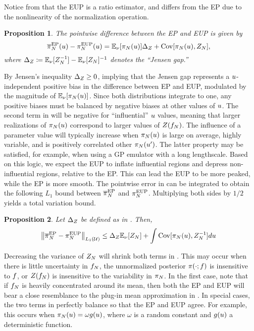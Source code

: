 \documentclass[12pt]{article}
\newtheorem{prop}{Proposition}
\begin{document}
Notice from  that the EUP is a ratio estimator, and differs from 
the EP due to the nonlinearity of the normalization operation.

\begin{prop} \label{prop:ep-eup-pw-err}
The pointwise difference between the EP and EUP is given by
\begin{equation}
\overline{\pi}_{N}^{\mathrm{EP}}(u) - \pi_{N}^{\mathrm{EUP}}(u)
= \mathbb{E}_{\nu_{}}[\pi_{N}(u)] \Delta_Z + \mathrm{Cov}[\pi_{N}(u), Z_{N}],
\label{eq:ep-eup-pw-err}
\end{equation}
where $\Delta_Z \coloneqq \mathbb{E}_{\nu_{}}[Z_{N}^{-1}] - \mathbb{E}_{\nu_{}}[Z_{N}]^{-1}$
denotes the ``Jensen gap.''
\end{prop}

By Jensen's inequality $\Delta_Z \geq 0$, implying that the Jensen gap represents a 
$u$-independent positive bias in the difference between EP and EUP, modulated by the magnitude of 
$\mathbb{E}_{\nu_{}}[\pi_{N}(u)]$. Since both distributions integrate to one, any positive 
biases must be balanced by negative biases at other values of $u$.
The second term in  will be negative for ``influential'' $u$ values, 
meaning that larger realizations of $\pi_{N}(u)$ correspond to larger values of 
$Z(f_{N})$. The influence of a parameter value will typically increase when 
$\pi_{N}(u)$ is large on average, highly variable, and is positively correlated other 
$\pi_{N}(u^\prime)$. The latter property may be satisfied, for example, when using 
a GP emulator with a long lengthscale. Based on this logic, we expect the EUP to inflate 
influential regions and depress non-influential regions, relative to the EP. This can lead 
the EUP to be more peaked, while the EP is more smooth. The pointwise error in 
 can be integrated to obtain the following $L_1$ bound 
between $\overline{\pi}_{N}^{\mathrm{EP}}$ and $\pi_{N}^{\mathrm{EUP}}$. Multiplying both sides by $1/2$
yields a total variation bound.

\begin{prop} \label{prop:ep-eup-TV-err}
Let $\Delta_Z$ be defined as in . Then,
\begin{equation}
\left\lVert\overline{\pi}_{N}^{\mathrm{EP}} - \pi_{N}^{\mathrm{EUP}}\right\rVert_{L_1(\mathcal{U})}
\leq \Delta_Z \mathbb{E}_{\nu_{}}[Z_{N}] + \int \mathrm{Cov}[\pi_{N}(u), Z_{N}^{-1}] du
\label{eq:ep-eup-TV-err}
\end{equation}
\end{prop}

Decreasing the variance of $Z_{N}$ will shrink both terms in 
. This may occur when there is little 
uncertainty in $f_{N}$, the unnormalized posterior $\pi(\cdot; f)$
is insensitive to $f$, or $Z(f_{N})$ is insensitive to the variability 
in $\pi_{N}$. In the first case, note that if $f_{N}$ is heavily 
concentrated around its mean, then both the EP and EUP will bear a close resemblance
to the plug-in mean approximation in .
In special cases, the two terms in  perfectly balance so that 
the EP and EUP agree. For example, this occurs when 
$\pi_{N}(u) = \omega g(u)$, where $\omega$ is a random constant and 
$g(u)$ a deterministic function. 
\end{document}
